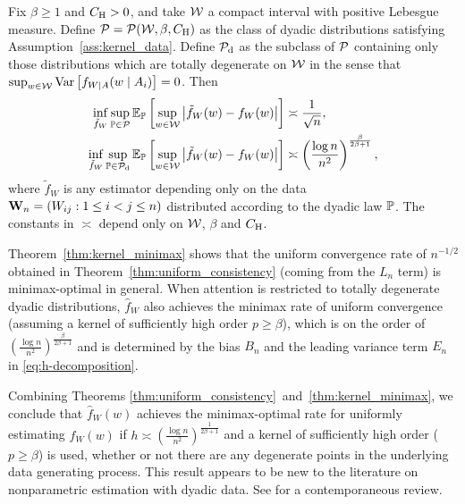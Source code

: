 \begin{theorem}
  \label{thm:kernel_minimax}

  Fix $\beta \geq 1$ and $C_\rH > 0$, and take $\cW$ a compact interval with
  positive Lebesgue measure. Define $\cP = \cP(\cW, \beta, C_\rH)$ as the class
  of dyadic distributions satisfying Assumption~\ref{ass:kernel_data}. Define
  $\cP_\rd$ as the subclass of $\cP$ containing only those distributions which
  are totally degenerate on $\cW$ in the sense that
  $\sup_{w \in \cW} \Var\left[f_{W \mid A}(w \mid A_i)\right] = 0$. Then
  \begin{align*}
    \inf_{\tilde f_W}
    \sup_{\P \in \cP}
    \E_\P\left[
      \sup_{w \in \cW}
      \big| \tilde f_W(w) - f_W(w) \big|
    \right]
    &\asymp
    \frac{1}{\sqrt n}, \\
    \inf_{\tilde f_W}
    \sup_{\P \in \cP_\rd}
    \E_\P\left[
      \sup_{w \in \cW}
      \big| \tilde f_W(w) - f_W(w) \big|
    \right]
    &\asymp
    \left( \frac{\log n}{n^2} \right)^{\frac{\beta}{2\beta+1}},
  \end{align*}
  where $\tilde f_W$ is any estimator depending only on the data
  $\bW_n = (W_{i j}: 1 \leq i < j \leq n)$ distributed according to the dyadic
  law $\P$. The constants in $\asymp$ depend only on $\cW$, $\beta$ and $C_\rH$.

\end{theorem}

Theorem~\ref{thm:kernel_minimax} shows that the uniform convergence rate of
$n^{-1/2}$ obtained in Theorem~\ref{thm:uniform_consistency}
(coming from the $L_n$ term) is minimax-optimal in general.
When attention is restricted to totally degenerate dyadic distributions,
$\hat f_W$ also achieves the minimax rate of uniform convergence
(assuming a kernel of sufficiently high order $p \geq \beta$),
which is on the order of
$\left(\frac{\log n}{n^2}\right)^{\frac{\beta}{2\beta+1}}$ and
is determined by the bias $B_n$ and the leading variance term $E_n$ in
\eqref{eq:h-decomposition}.

Combining Theorems \ref{thm:uniform_consistency}~and~\ref{thm:kernel_minimax},
we conclude that $\hat{f}_W(w)$ achieves the minimax-optimal rate for uniformly
estimating $f_W(w)$ if $h \asymp \left( \frac{\log n}{n^2}
\right)^{\frac{1}{2\beta+1}}$ and a kernel of sufficiently high order
($p \geq \beta$) is used, whether or not there are any degenerate points in the
underlying data generating process. This result appears to be new to the
literature on nonparametric estimation with dyadic data. See
\citet{gao2021minimax} for a contemporaneous review.

